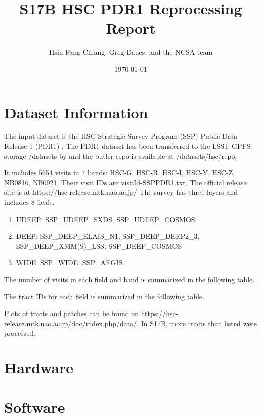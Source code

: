 \documentclass[DM,authoryear,toc]{lsstdoc}
\title{S17B HSC PDR1 Reprocessing Report}
\author{%
Hsin-Fang Chiang, Greg Daues, and the NCSA team
}
\date{\today}
\begin{document}
\maketitle

\section{Dataset Information}
The input dataset is the HSC Strategic Survey Program (SSP) Public Data Release 1 (PDR1) \citep{2017arXiv170208449A}.
The PDR1 dataset has been transferred to the LSST GPFS storage /datasets by  and the butler repo is available at /datasets/hsc/repo.

It includes 5654 visits in 7 bands: HSC-G, HSC-R, HSC-I, HSC-Y, HSC-Z, NB0816, NB0921. Their visit IDs are visitId-SSPPDR1.txt.  The official release site is at https://hsc-release.mtk.nao.ac.jp/
The survey has three layers and includes 8 fields.
\begin{enumerate}
\item
UDEEP: SSP{\_}UDEEP{\_}SXDS, SSP{\_}UDEEP{\_}COSMOS
\item
DEEP: SSP{\_}DEEP{\_}ELAIS{\_}N1, SSP{\_}DEEP{\_}DEEP2{\_}3, SSP{\_}DEEP{\_}XMM(S){\_}LSS, SSP{\_}DEEP{\_}COSMOS
\item
WIDE: SSP{\_}WIDE, SSP{\_}AEGIS
\end{enumerate}

The number of visits in each field and band is summarized in the following table.


The tract IDs for each field is summarized in the following table.


Plots of tracts and patches can be found on  https://hsc-release.mtk.nao.ac.jp/doc/index.php/data/. In S17B, more tracts than listed were processed.

\section{Hardware}

\section{Software}



\end{document}
